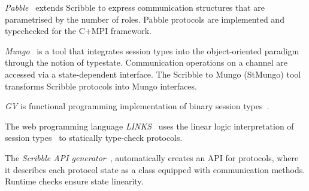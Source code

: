 {\em Pabble}~\cite{DBLP:conf/pdp/NgY14} extends Scribble to express
communication structures that are parametrised by the number of roles.
Pabble protocols are implemented and typechecked for the C+MPI framework.

{\em Mungo}~\cite{mungo} is a tool that integrates session types into the object-oriented
paradigm through the notion of typestate. Communication
operations on a channel are accessed via a state-dependent interface.
The Scribble to Mungo (StMungo) tool transforms Scribble
protocols into Mungo interfaces.


{\em GV} is functional programming implementation of binary session types~\cite{DBLP:journals/jfp/Wadler14}.

The web programming language {\em LINKS}~\cite{citation_needed}
uses the linear logic interpretation of session types~\cite{DBLP:journals/jfp/Wadler14}
to statically type-check protocols.

The {\em Scribble API generator}~\cite{citation_needed}, automatically creates an API for protocols,
where it describes each protocol state as a class equipped with
communication methods. Runtime checks ensure state linearity.






